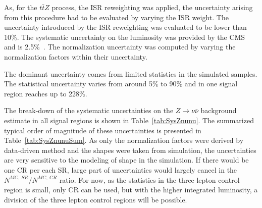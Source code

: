 As, for the $t\bar{t}Z$ process, the ISR reweighting was applied, the uncertainty arising from this procedure had to be evaluated by varying the ISR weight. The uncertainty introduced by the ISR reweighting was evaluated to be lower than 10\%. The systematic uncertainty on the luminosity was provided by the CMS and is  2.5\%~\cite{CMS-PAS-LUM-17-001}. The normalization uncertainty was computed by varying the normalization factors within their uncertainty.

The dominant uncertainty comes from limited statistics in the simulated samples. The statistical uncertainty varies from around 5\% to 90\% and in one signal region reaches up to 228\%.

The break-down of the systematic uncertainties on the $Z \to \nu \bar{\nu}$  background estimate in all signal regions is shown in Table~\ref{tab:SysZnunu}. The summarized typical order of magnitude of these uncertainties is presented in Table~\ref{tab:SysZnunuSum}. As only the normalization factors were derived by data-driven method and the shapes were taken from simulation, the uncertainties are very sensitive to the modeling of shape in the simulation. If there would be one CR per each SR, large part of uncertainties would largely cancel in the $N^{MC,~SR}/ N^{MC,~CR}$ ratio. For now, as the statistics in the three lepton control region is small, only CR can be used, but with the higher integrated luminosity, a division of the three lepton control regions will be possible.



